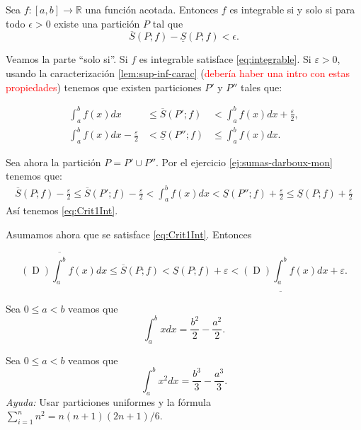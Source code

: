  
\begin{teorema}{}  Sea $f:[a,b]\to\mathbb{R}$ una función acotada. Entonces  $f$ es integrable si y solo si para todo $\epsilon>0$ existe una partición $P$ tal que 
\begin{equation}\label{eq:Crit1Int}
 \overline{S}(P;f)-\underline{S}(P;f)<\epsilon.
\end{equation}
 
\end{teorema}

\begin{demo} Veamos la parte ``solo si''. Si $f$ es integrable satisface \eqref{eq:integrable}. Si $\varepsilon>0$, usando la caracterización \eqref{lem:sup-inf-carac} (\textcolor{red}{debería haber una intro con estas propiedades}) tenemos que existen particiones $P'$ y $P''$ tales que:


\begin{eqnarray*}
 \int_a^bf(x)dx&\leq \overline{S}(P';f)&<\int_a^bf(x)dx+\frac{\varepsilon}{2},\\
 \int_a^bf(x)dx-\frac{\varepsilon}{2}&<\underline{S}(P'';f)&\leq\int_a^bf(x)dx.
\end{eqnarray*}

Sea ahora la partición $P=P'\cup P''$. Por el ejercicio \eqref{ej:sumas-darboux-mon} tenemos que:
\begin{multline*}
 \overline{S}(P;f)-\frac{\varepsilon}{2}\leq \overline{S}(P';f)-\frac{\varepsilon}{2}<\int_a^bf(x)dx<\underline{S}(P'';f)+\frac{\varepsilon}{2}
 \leq \underline{S}(P;f)+\frac{\varepsilon}{2}
\end{multline*}
Así tenemos \eqref{eq:Crit1Int}. 

Asumamos ahora que se satisface \eqref{eq:Crit1Int}. Entonces 

 \[
   (\mathop{D})\overline{\int_a^b}f(x)dx\leq \overline{S}(P;f)<
   \underline{S}(P;f)+\varepsilon<(\mathop{D})\underline{\int_a^b}f(x)dx +\varepsilon.
 \]


 
\end{demo}


\begin{ejemplo}{} Sea $0\leq a<b$ veamos que 
\[
 \int_a^b x dx=\frac{b^2}{2}-\frac{a^2}{2}.
\]
\end{ejemplo}


\begin{ejercicio}{} Sea $0\leq a<b$ veamos que 
\[
 \int_a^b x^2 dx=\frac{b^3}{3}-\frac{a^3}{3}.
\]
{\em Ayuda:} Usar particiones uniformes y la fórmula $\sum_{i=1}^nn^2= n(n+1)(2n+1)/6$.
\end{ejercicio}

